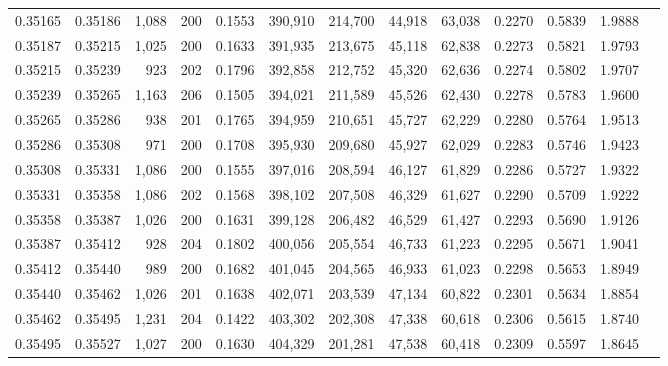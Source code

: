 \begin{tabular}{rrrrrrrrrrrrr}
0.35165 & 0.35186 & 1,088 & 200 &                                     0.1553 & 390,910 & 214,700 &  44,918 &  63,038 & 0.2270 & 0.5839 & 1.9888 \\
0.35187 & 0.35215 & 1,025 & 200 &                                     0.1633 & 391,935 & 213,675 &  45,118 &  62,838 & 0.2273 & 0.5821 & 1.9793 \\
0.35215 & 0.35239 &   923 & 202 &                                     0.1796 & 392,858 & 212,752 &  45,320 &  62,636 & 0.2274 & 0.5802 & 1.9707 \\
0.35239 & 0.35265 & 1,163 & 206 &                                     0.1505 & 394,021 & 211,589 &  45,526 &  62,430 & 0.2278 & 0.5783 & 1.9600 \\
0.35265 & 0.35286 &   938 & 201 &                                     0.1765 & 394,959 & 210,651 &  45,727 &  62,229 & 0.2280 & 0.5764 & 1.9513 \\
0.35286 & 0.35308 &   971 & 200 &                                     0.1708 & 395,930 & 209,680 &  45,927 &  62,029 & 0.2283 & 0.5746 & 1.9423 \\
0.35308 & 0.35331 & 1,086 & 200 &                                     0.1555 & 397,016 & 208,594 &  46,127 &  61,829 & 0.2286 & 0.5727 & 1.9322 \\
0.35331 & 0.35358 & 1,086 & 202 &                                     0.1568 & 398,102 & 207,508 &  46,329 &  61,627 & 0.2290 & 0.5709 & 1.9222 \\
0.35358 & 0.35387 & 1,026 & 200 &                                     0.1631 & 399,128 & 206,482 &  46,529 &  61,427 & 0.2293 & 0.5690 & 1.9126 \\
0.35387 & 0.35412 &   928 & 204 &                                     0.1802 & 400,056 & 205,554 &  46,733 &  61,223 & 0.2295 & 0.5671 & 1.9041 \\
0.35412 & 0.35440 &   989 & 200 &                                     0.1682 & 401,045 & 204,565 &  46,933 &  61,023 & 0.2298 & 0.5653 & 1.8949 \\
0.35440 & 0.35462 & 1,026 & 201 &                                     0.1638 & 402,071 & 203,539 &  47,134 &  60,822 & 0.2301 & 0.5634 & 1.8854 \\
0.35462 & 0.35495 & 1,231 & 204 &                                     0.1422 & 403,302 & 202,308 &  47,338 &  60,618 & 0.2306 & 0.5615 & 1.8740 \\
0.35495 & 0.35527 & 1,027 & 200 &                                     0.1630 & 404,329 & 201,281 &  47,538 &  60,418 & 0.2309 & 0.5597 & 1.8645 \\

\end{tabular}
